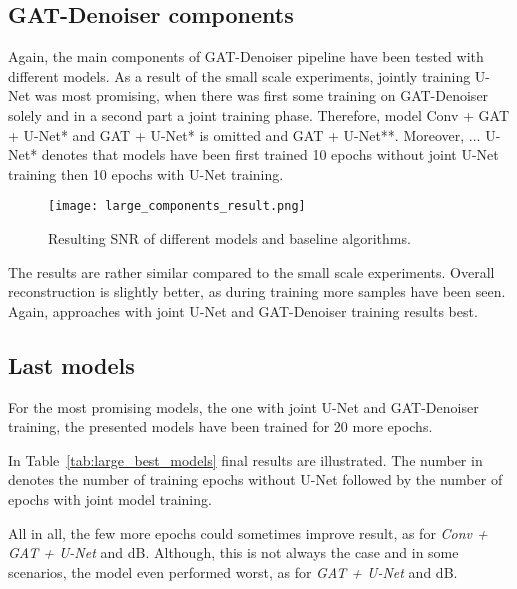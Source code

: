\subsection{GAT-Denoiser components}
Again, the main components of GAT-Denoiser pipeline have been tested with different models.
As a result of the small scale experiments, jointly training U-Net was most promising, 
when there was first some training on GAT-Denoiser solely and in a second part a joint training phase.
Therefore, model {Conv + GAT + U-Net*} and {GAT + U-Net*} is omitted and {GAT + U-Net**}.
Moreover, {... U-Net*} denotes that models have been first trained 10 epochs without
joint U-Net training then 10 epochs with U-Net training.


\begin{figure}[H]
  \centering
  \label{fig:large_components}
  \texttt{[image: large\_components\_result.png]}
  \caption{
    Resulting SNR of different models and baseline algorithms.
    }
\end{figure}

The results are rather similar compared to the small scale experiments.
Overall reconstruction is slightly better, as during training more samples have been seen.
Again, approaches with joint U-Net and GAT-Denoiser training results best.

\subsection{Last models}

For the most promising models, the one with joint U-Net and GAT-Denoiser training,
the presented models have been trained for 20 more epochs. 
  
In Table~\ref{tab:large_best_models} final results are illustrated. 
The number in denotes the number of training epochs without U-Net followed by
the number of epochs with joint model training.

All in all, the few more epochs could sometimes improve result, as for \textit{Conv + GAT + U-Net} and  dB.
Although, this is not always the case and in some scenarios, the model even performed worst, as for 
\textit{GAT + U-Net} and  dB.


